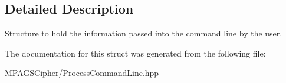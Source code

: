 \subsection{Detailed Description}
Structure to hold the information passed into the command line by the user. 

The documentation for this struct was generated from the following file\-:\begin{DoxyCompactItemize}
\item 
M\-P\-A\-G\-S\-Cipher/Process\-Command\-Line.\-hpp\end{DoxyCompactItemize}
